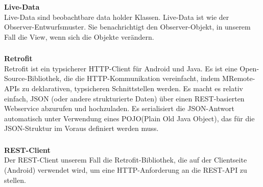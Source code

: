 \subsubsection{} 
\textbf{Live-Data}\\
Live-Data sind beobachtbare data holder Klassen. Live-Data ist wie der Observer-Entwurfsmuster. Sie benachrichtigt den Observer-Objekt, in unserem Fall die View, wenn sich die Objekte verändern. 

\subsubsection{} 
\textbf{Retrofit}\\
Retrofit ist ein typsicherer HTTP-Client für Android und Java. Es ist eine Open-Source-Bibliothek, die die HTTP-Kommunikation vereinfacht, indem MRemote-APIs zu deklarativen, typsicheren Schnittstellen werden. Es macht es relativ einfach, JSON (oder andere strukturierte Daten) über einen REST-basierten Webservice abzurufen und hochzuladen. Es serialisiert die JSON-Antwort automatisch unter Verwendung eines POJO(Plain Old Java Object), das für die JSON-Struktur im Voraus definiert werden muss.


\subsubsection{} 
\textbf{REST-Client}\\
Der REST-Client unserem Fall die Retrofit-Bibliothek, die auf der Clientseite (Android) verwendet wird, um eine HTTP-Anforderung an die REST-API zu stellen.
